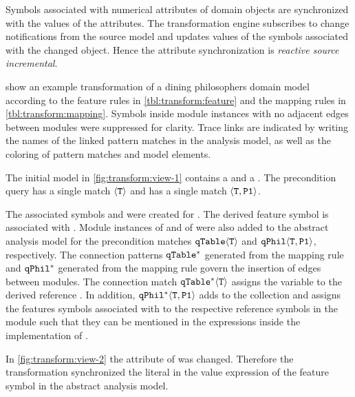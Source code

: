 Symbols associated with numerical attributes of domain objects are synchronized with the values of the attributes. The transformation engine subscribes to change notifications from the source model and updates values of the symbols associated with the changed object. Hence the attribute synchronization is \emph{reactive source incremental}.

\begin{runningExample}
   show an example transformation of a dining philosophers domain model according to the feature rules in \vref{tbl:transform:feature} and the mapping rules in \vref{tbl:transform:mapping}. Symbols inside module instances with no adjacent edges between modules were suppressed for clarity. Trace links are indicated by writing the names of the linked pattern matches in the analysis model, as well as the coloring of pattern matches and model elements.

  The initial model in \vref{fig:transform:view-1} contains a   and a  . The precondition query  has a single match \(\langle \texttt{\upshape T} \rangle\) and  has a single match \(\langle \texttt{\upshape T}, \texttt{\upshape P1} \rangle\).

  The associated symbols  and  were created for . The derived feature symbol  is associated with . Module instances  of  and  of  were also added to the abstract analysis model for the precondition matches \(\texttt{\upshape qTable}\langle \texttt{\upshape T} \rangle\) and \(\texttt{\upshape qPhil}\langle \texttt{\upshape T}, \texttt{\upshape P1} \rangle\), respectively. The connection patterns \(\texttt{\upshape qTable}^*\) generated from the  mapping rule and \(\texttt{\upshape qPhil}^*\) generated from the  mapping rule govern the insertion of  edges between modules. The connection match \(\texttt{\upshape qTable}^*\langle \texttt{\upshape T} \rangle\) assigns the variable  to the derived reference . In addition, \(\texttt{\upshape qPhil}^*\langle \texttt{\upshape T}, \texttt{\upshape P1} \rangle\) adds  to the collection  and assigns the features symbols associated with  to the respective reference symbols in the module  such that they can be mentioned in the expressions inside the implementation of .

  In \vref{fig:transform:view-2} the attribute  of  was changed. Therefore the transformation synchronized the literal in the value expression of the feature symbol  in the abstract analysis model.


\end{runningExample}
